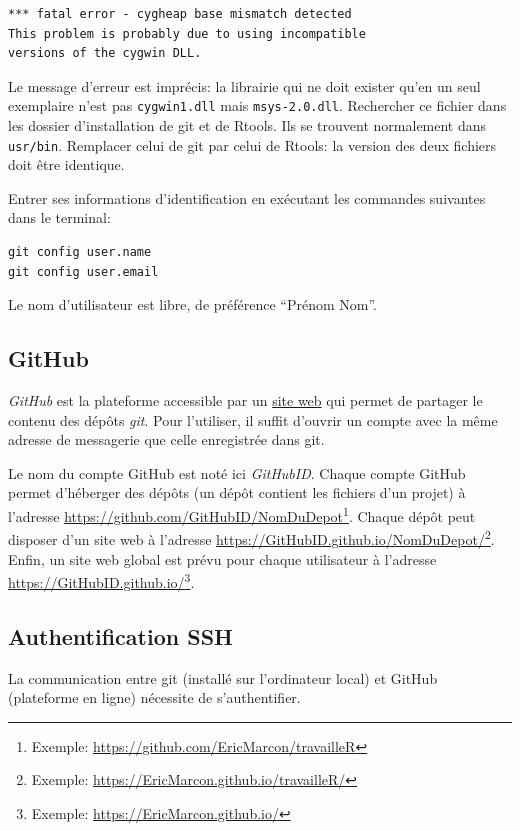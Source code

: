 \documentclass[
  12pt,
  french,
  a4paper,
  extrafontsizes,onecolumn,openright
  ]{memoir}
\begin{document}
\begin{verbatim}
*** fatal error - cygheap base mismatch detected
This problem is probably due to using incompatible 
versions of the cygwin DLL.
\end{verbatim}

Le message d'erreur est imprécis: la librairie qui ne doit exister qu'en un seul exemplaire n'est pas \texttt{cygwin1.dll} mais \texttt{msys-2.0.dll}.
Rechercher ce fichier dans les dossier d'installation de git et de Rtools.
Ils se trouvent normalement dans \texttt{usr/bin}.
Remplacer celui de git par celui de Rtools: la version des deux fichiers doit être identique.

Entrer ses informations d'identification en exécutant les commandes suivantes dans le terminal:

\begin{verbatim}
git config user.name
git config user.email
\end{verbatim}

Le nom d'utilisateur est libre, de préférence \enquote{Prénom Nom}.

\subsection{GitHub}\label{github}

\emph{GitHub} est la plateforme accessible par un \href{https://github.com/}{site web} qui permet de partager le contenu des dépôts \emph{git}.
Pour l'utiliser, il suffit d'ouvrir un compte avec la même adresse de messagerie que celle enregistrée dans git.

Le nom du compte GitHub est noté ici \emph{GitHubID}.
Chaque compte GitHub permet d'héberger des dépôts (un dépôt contient les fichiers d'un projet) à l'adresse \url{https://github.com/GitHubID/NomDuDepot}\footnote{Exemple: \url{https://github.com/EricMarcon/travailleR}}.
Chaque dépôt peut disposer d'un site web à l'adresse \url{https://GitHubID.github.io/NomDuDepot/}\footnote{Exemple: \url{https://EricMarcon.github.io/travailleR/}}.
Enfin, un site web global est prévu pour chaque utilisateur à l'adresse \url{https://GitHubID.github.io/}\footnote{Exemple: \url{https://EricMarcon.github.io/}}.

\subsection{Authentification SSH}\label{sec:SSH}

La communication entre git (installé sur l'ordinateur local) et GitHub (plateforme en ligne) nécessite de s'authentifier.
\end{document}
